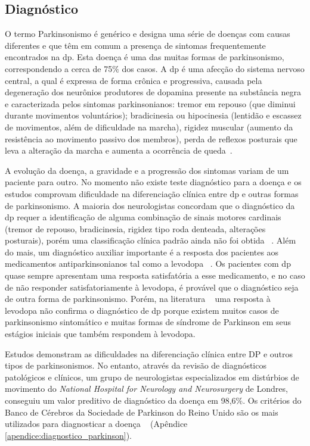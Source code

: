\subsection{Diagnóstico}
O termo Parkinsonismo é genérico e designa uma série de doenças com causas diferentes e que têm em comum a presença de sintomas frequentemente encontrados na \ac{dp}. Esta doença é uma das muitas formas de parkinsonismo, correspondendo a cerca de 75$\%$ dos casos. A \ac{dp} é uma afecção do sistema nervoso central, a qual é expressa de forma crônica e progressiva, causada pela degeneração dos neurônios produtores de dopamina presente na substância negra e caracterizada pelos sintomas parkinsonianos: tremor em repouso (que diminui durante movimentos voluntários); bradicinesia ou hipocinesia (lentidão e escassez de movimentos, além de dificuldade na marcha), rigidez muscular (aumento da resistência ao movimento passivo dos membros), perda de reflexos posturais que leva a alteração da marcha e aumenta a ocorrência de queda~\cite{tolosa06,rodrigues2006}. 

A evolução da doença, a gravidade e a progressão dos sintomas variam de um paciente para outro. No momento não existe teste diagnóstico para a doença e os estudos comprovam dificuldade na diferenciação clínica entre \ac{dp} e outras formas de parkinsonismo. A maioria dos neurologistas concordam que o diagnóstico da \ac{dp} requer a identificação de alguma combinação de sinais motores cardinais (tremor de repouso, bradicinesia, rigidez tipo roda denteada, alterações posturais), porém uma classificação clínica padrão ainda não foi obtida ~\cite{protpar010}. Além do mais, um diagnóstico auxiliar importante é a resposta dos pacientes aos medicamentos antiparkinsonianos tal como a levodopa ~\cite{protpar010}. Os pacientes com \ac{dp} quase sempre apresentam uma resposta satisfatória a esse medicamento, e no caso de não responder satisfatoriamente à levodopa, é provável que o diagnóstico seja de outra forma de parkinsonismo. Porém, na literatura ~\cite{rowlandtratado} uma resposta à levodopa não confirma o diagnóstico de \ac{dp} porque existem muitos casos de parkinsonismo sintomático e muitas formas de síndrome de Parkinson em seus estágios iniciais que também respondem à levodopa. 

Estudos demonstram as dificuldades na diferenciação clínica entre DP e outros tipos de parkinsonismos. No entanto, através da revisão de diagnósticos patológicos e clínicos, um grupo de neurologistas especializados em distúrbios de movimento do \textit{National Hospital for Neurology and Neurosurgery} de Londres, conseguiu um valor preditivo de diagnóstico da doença em 98,6$\%$. Os critérios do Banco de Cérebros da Sociedade de Parkinson do Reino Unido são os mais utilizados para diagnosticar a doença ~\cite{protpar010} (Apêndice \ref{apendice:diagnostico_parkinson}). 



